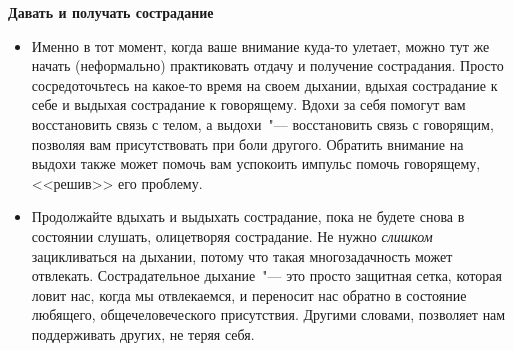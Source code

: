 \vspace{2ex}

{\large \textbf{Давать и получать сострадание}}
\begin{itemize}
	\item Именно в тот момент, когда ваше внимание куда-то улетает, можно тут же начать (неформально) практиковать отдачу и получение сострадания. Просто сосредоточьтесь на какое-то время на своем дыхании, вдыхая сострадание к себе и выдыхая сострадание к говорящему. Вдохи за себя помогут вам восстановить связь с телом, а выдохи~"--- восстановить связь с говорящим, позволяя вам присутствовать при боли другого. Обратить внимание на выдохи также может помочь вам успокоить импульс помочь говорящему, <<решив>> его проблему.
	
	\item Продолжайте вдыхать и выдыхать сострадание, пока не будете снова в состоянии слушать, олицетворяя сострадание. Не нужно \emph{слишком} зацикливаться на дыхании, потому что такая многозадачность может отвлекать. Сострадательное дыхание~"--- это просто защитная сетка, которая ловит нас, когда мы отвлекаемся, и переносит нас обратно в состояние любящего, общечеловеческого присутствия. Другими словами, позволяет нам поддерживать других, не теряя себя.
\end{itemize}

\newpage
{}